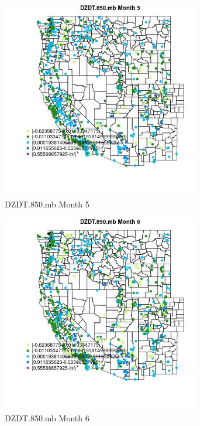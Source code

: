 \begin{figure} 
\centering  
\includegraphics[width=0.77\textwidth]{Code_Outputs/Report_ML_input_PM25_Step4_part_e_de_duplicated_aves_compiled_2019-05-21wNAs_MapObsMo5DZDT850mb.jpg} 
\caption{\label{fig:Report_ML_input_PM25_Step4_part_e_de_duplicated_aves_compiled_2019-05-21wNAsMapObsMo5DZDT850mb}DZDT.850.mb Month 5} 
\end{figure} 
 

\begin{figure} 
\centering  
\includegraphics[width=0.77\textwidth]{Code_Outputs/Report_ML_input_PM25_Step4_part_e_de_duplicated_aves_compiled_2019-05-21wNAs_MapObsMo6DZDT850mb.jpg} 
\caption{\label{fig:Report_ML_input_PM25_Step4_part_e_de_duplicated_aves_compiled_2019-05-21wNAsMapObsMo6DZDT850mb}DZDT.850.mb Month 6} 
\end{figure} 
 

